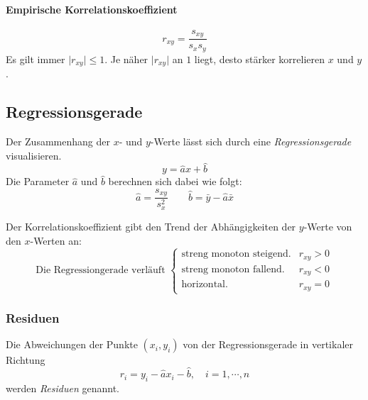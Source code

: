 \documentclass[a4paper, 11pt, accentcolor = tud3b]{tudreport}
\newcommand{\abs}[1]{\ensuremath{{\lvert #1 \rvert}}}
\begin{document}
                    \paragraph{Empirische Korrelationskoeffizient}
                    \begin{equation*}
	                    r_{xy} = \frac{s_{xy}}{s_x s_y}
                    \end{equation*}
                    Es gilt immer \( \abs{r_{xy}} \leq 1 \). Je näher \( \abs{r_{xy}} \) an \(1\) liegt, desto stärker korrelieren \(x\) und \(y\).

            \subsection{Regressionsgerade}
                Der Zusammenhang der \(x\)- und \(y\)-Werte lässt sich durch eine \textit{Regressionsgerade} visualisieren.
               	\begin{equation*}
                	y = \hat{a} x + \hat{b}
               	\end{equation*}
               	Die Parameter \( \hat{a} \) und \( \hat{b} \) berechnen sich dabei wie folgt:
               	\begin{equation*}
	               	\hat{a} = \frac{s_{xy}}{s_x^2} \qquad \hat{b} = \bar{y} - \hat{a} \bar{x}
               	\end{equation*}
               	
               	Der Korrelationskoeffizient gibt den Trend der Abhängigkeiten der \(y\)-Werte von den \(x\)-Werten an:
               	\begin{equation*}
	               	\text{Die Regressiongerade verläuft }
	               	\begin{cases}
	               		\textrm{streng monoton steigend.} & r_{xy} > 0 \\
	               		\textrm{streng monoton fallend.}  & r_{xy} < 0 \\
	               		\textrm{horizontal.}              & r_{xy} = 0
	               	\end{cases}
               	\end{equation*}
               	
               	\subsubsection{Residuen}
	               	Die Abweichungen der Punkte \( (x_i, y_i) \) von der Regressionsgerade in vertikaler Richtung
	               	\begin{equation*}
		               	r_i = y_i - \hat{a} x_i - \hat{b}, \quad i = 1, \cdots, n
	               	\end{equation*}
	               	werden \textit{Residuen} genannt.
	               	
\end{document}
